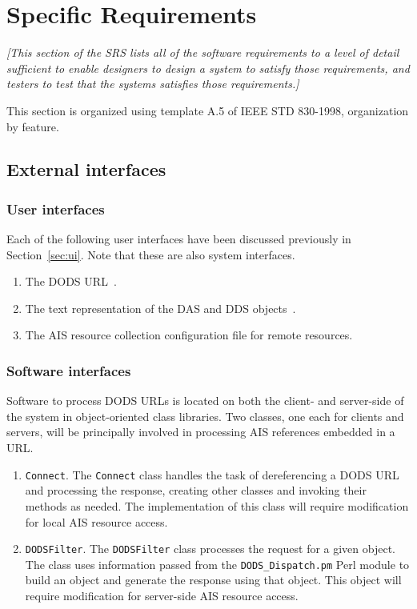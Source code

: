 \documentclass{article}
\begin{document}

\section{Specific Requirements}
\label{sec:specific}
\emph{[This section of the \ac{SRS} lists all of the software requirements to
  a level of detail sufficient to enable designers to design a system to
  satisfy those requirements, and testers to test that the systems satisfies
  those requirements.]}

This section is organized using template A.5 of IEEE STD 830-1998,
organization by feature.

\subsection{External interfaces}
\subsubsection{User interfaces}
Each of the following user interfaces have been discussed
previously in Section~\ref{sec:ui}. Note that these are also system
interfaces. 
\begin{enumerate}
\item The \ac{DODS} \ac{URL}~\cite{gallagher:dap-spec}.
\item The text representation of the \ac{DAS} and \ac{DDS}
  objects~\cite{gallagher:dap-spec}.
\item The \ac{AIS} resource collection configuration file for remote
  resources. 
\end{enumerate}

\subsubsection{Software interfaces}
\label{sec:si}
Software to process \ac{DODS} \ac{URL}s is located on both the client- and
server-side of the system in object-oriented class libraries. Two classes,
one each for clients and servers, will be principally involved in processing
\ac{AIS} references embedded in a \ac{URL}.
\begin{enumerate}
\item \texttt{Connect}. The \texttt{Connect} class handles the task of
  dereferencing a \ac{DODS} \ac{URL} and processing the response,
  creating other classes and invoking their methods as needed. The
  implementation of this class will require modification for local \ac{AIS}
  resource access.
\item \texttt{DODSFilter}. The \texttt{DODSFilter} class processes the
  request for a given object. The class uses information passed from the
  \texttt{DODS\_Dispatch.pm} Perl module to build an object and generate the
  response using that object. This object will require modification for
  server-side \ac{AIS} resource access.
\end{enumerate}
\end{document}
